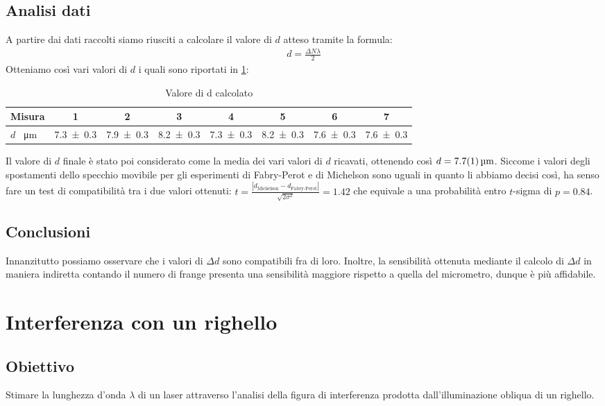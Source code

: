 \documentclass[a4paper]{article}
\begin{document}
\subsection{Analisi dati}
A partire dai dati raccolti siamo riusciti a calcolare il valore di $d$ atteso tramite la formula: 
\begin{align}
    d=\frac{\Delta N \lambda}{2}
\end{align}
Otteniamo così vari valori di $d$ i quali sono riportati in \cref{tab:valori-d-michelson}:

\begin{table}[htbp]
\centering
\begin{tabular}{|l|ccccccc|}
\hline
Misura & 1 & 2 & 3 & 4 & 5 & 6 & 7 \\\hline\hline
$d$ \SI{}{\micro\meter} & \SI{7.3 \pm 0.3}{} & \SI{7.9 \pm 0.3}{} & \SI{8.2 \pm 0.3}{} & \SI{7.3 \pm 0.3}{} & \SI{8.2 \pm 0.3}{} & \SI{7.6 \pm 0.3}{} & \SI{7.6 \pm 0.3}{} \\\hline
\end{tabular}
\caption{Valore di d calcolato}
\label{tab:valori-d-michelson}
\end{table}

Il valore di $d$ finale è stato poi considerato come la media dei vari valori di $d$ ricavati, ottenendo così $d=\SI{7.7\pm0.1}{\micro\meter}$.
Siccome i valori degli spostamenti dello specchio movibile per gli esperimenti di Fabry-Perot e di Michelson sono uguali in quanto li abbiamo decisi così, ha senso fare un test di compatibilità tra i due valori ottenuti:
$t=\frac{|d_{\text{Michelson}}-d_{\text{Fabry-Perot}}|}{\sqrt{2\sigma^2}}=\num{1.42}$ che equivale a una probabilità entro $t$-sigma di $p=\num{0.84}$.

\subsection{Conclusioni}
Innanzitutto possiamo osservare che i valori di $\Delta d$ sono compatibili fra di loro. Inoltre, la sensibilità ottenuta mediante il calcolo di $\Delta d$ in maniera indiretta contando il numero di frange presenta una sensibilità maggiore rispetto a quella del micrometro, dunque è più affidabile.


\section{Interferenza con un righello}
\subsection{Obiettivo}
Stimare la lunghezza d'onda $\lambda$ di un laser attraverso l'analisi della figura di interferenza prodotta dall'illuminazione obliqua di un righello. 
\end{document}
